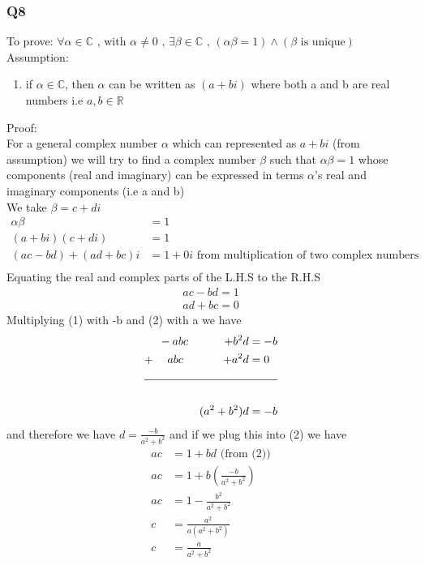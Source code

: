 \documentclass{article}
\begin{document}
\subsubsection*{Q8}
To prove: $\forall \alpha \in \mathbb{C} \textrm{ , with } \alpha \neq 0
\textrm{ , } \exists \beta \in \mathbb{C} \textrm{ , } (\alpha\beta =1) \land
(\beta\textrm{ is unique})
$ \\
Assumption: 
\begin{enumerate}
\item if $\alpha \in \mathbb{C}$, then $\alpha$ can be written as $(a + bi)$ where both a and b are real numbers i.e $a,b\in \mathbb{R}$
\end{enumerate}
Proof: \\
For a general complex number $\alpha$ which can represented as $a + bi$ (from
assumption) we will try to find a complex number $\beta$ such that $\alpha\beta
= 1$ whose components (real
and imaginary) can be expressed in terms $\alpha$'s real and imaginary
components (i.e a and b) \\
We take $\beta = c + di$ \\
\begin{align*}
  \alpha\beta &= 1 \\
  (a + bi)(c + di) &= 1 \\
  (ac-bd) + (ad+bc)i &= 1 + 0i \textrm{ from multiplication of two complex numbers} \\
\end{align*}
Equating the real and complex parts of the L.H.S to the R.H.S \\
\begin{gather}
  ac - bd = 1 \\
  ad + bc = 0 
\end{gather}
Multiplying (1) with -b and (2) with a we have
\begin{alignat*}{2}
    & -abc &+ b^{2}d & = -b \\
    +\hspace*{.5em} &\phantom{-}abc &+ a^{2}d & = 0 \\
    \cline{1-4} \\
    && (a^2 + b^2)d &  = -b
\end{alignat*}
and therefore we have  $d =\frac{-b}{ a^2 + b^2}$ and if we plug this into (2)
we have
\begin{align*}
  ac &= 1 + bd \textrm{ (from (2))} \\
  ac &= 1 + b(\frac{-b}{a^2 + b^2}) \\
  ac &= 1 - \frac{b^2}{a^2 + b^2} \\
  c &= \frac{a^2}{a(a^2 + b^2)} \\
  c &= \frac{a}{a^2 + b^2}
\end{align*}
\end{document}
